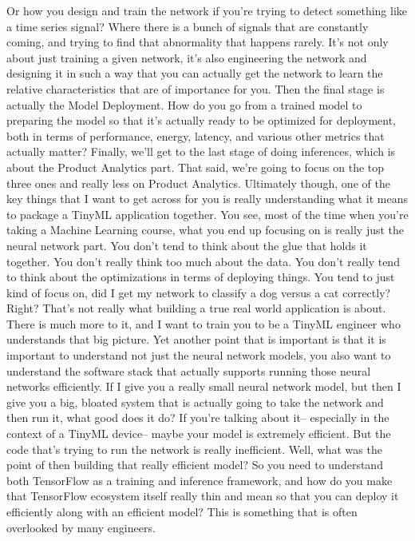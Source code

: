 Or how you design and train the network if you're trying to detect something
like a time series signal?
Where there is a bunch of signals that are constantly
coming, and trying to find that abnormality that happens rarely.
It's not only about just training a given network,
it's also engineering the network and designing it in such a way
that you can actually get the network to learn the relative characteristics that
are of importance for you.
Then the final stage is actually the Model Deployment.
How do you go from a trained model to preparing the model so that it's
actually ready to be optimized for deployment,
both in terms of performance, energy, latency, and various other metrics that
actually matter?
Finally, we'll get to the last stage of doing inferences, which
is about the Product Analytics part.
That said, we're going to focus on the top three ones
and really less on Product Analytics.
Ultimately though, one of the key things that I want to get across for you
is really understanding what it means to package a TinyML application together.
You see, most of the time when you're taking a Machine Learning
course, what you end up focusing on is really just the neural network part.
You don't tend to think about the glue that holds it together.
You don't really think too much about the data.
You don't really tend to think about the optimizations in terms
of deploying things.
You tend to just kind of focus on, did I get my network
to classify a dog versus a cat correctly?
Right?
That's not really what building a true real world application is about.
There is much more to it, and I want to train you to be a TinyML engineer who
understands that big picture.
Yet another point that is important is that it
is important to understand not just the neural network models,
you also want to understand the software stack that actually supports running
those neural networks efficiently.
If I give you a really small neural network model,
but then I give you a big, bloated system that
is actually going to take the network and then run it, what good does it do?
If you're talking about it-- especially in the context of a TinyML device--
maybe your model is extremely efficient.
But the code that's trying to run the network is really inefficient.
Well, what was the point of then building that really efficient model?
So you need to understand both TensorFlow as a training and inference
framework, and how do you make that TensorFlow ecosystem itself really thin
and mean so that you can deploy it efficiently
along with an efficient model?
This is something that is often overlooked by many engineers.
